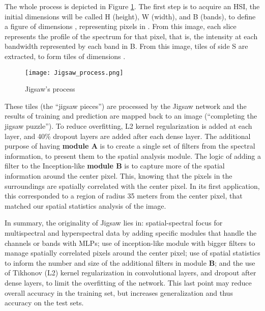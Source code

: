 \documentclass[lettersize, journal]{IEEEtran}
\begin{document}
The whole process is depicted in Figure \ref{fig:Jigsaw_process}. The first step is to acquire an HSI, the initial dimensions will be called H (height), W (width), and B (bands), to define a figure of dimensions , representing pixels  in . From this image, each  slice represents the profile of the spectrum for that pixel, that is, the intensity at each bandwidth represented by each band in B. From this image, tiles of side S are extracted, to form  tiles of dimensions .

\begin{figure}[!hbt]
    \centering
    \texttt{[image: Jigsaw\_process.png]}
    \caption{Jigsaw's process}
    \label{fig:Jigsaw_process}
\end{figure}

These  tiles (the “jigsaw pieces”) are processed by the Jigsaw network and the results of training and prediction are mapped back to an  image (“completing the jigsaw puzzle”).
To reduce overfitting, L2 kernel regularization is added at each layer, and 40\% dropout layers are added after each dense layer. 
The additional purpose of having \textbf{module A} is to create a single set of filters from the spectral information, to present them to the spatial analysis module. The logic of adding a  filter to the Inception-like \textbf{module B} is to capture more of the spatial information around the center pixel. This, knowing that the pixels in the surroundings are spatially correlated with the center pixel. In its first application, this corresponded to a region of radius 35 meters from the center pixel, that matched our spatial statistics analysis of the image.

In summary, the originality of Jigsaw lies in: spatial-spectral focus for multispectral and hyperspectral data by adding specific modules that handle the channels or bands with MLPs; use of inception-like module with bigger filters to manage spatially correlated pixels around the center pixel; use of spatial statistics to inform the number and size of the additional filters in module \textbf{B}; and the use of Tikhonov (L2) kernel regularization in convolutional layers, and dropout after dense layers, to limit the overfitting of the network. This last point may reduce overall accuracy in the training set, but increases generalization and thus accuracy on the test sets.
\end{document}
